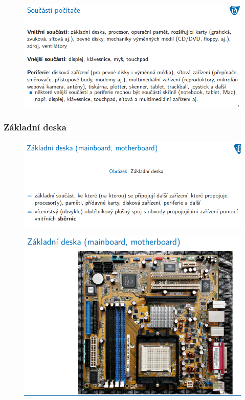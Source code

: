 \documentclass[10pt,a4paper]{article}
\begin{document}
\begin{figure} [h]
	\includegraphics[scale=0.65]{img/prvni_odstavec/otazka4/soucasti_pocitace3.png}	
\end{figure}

\clearpage
\subsubsection{Základní deska}
\begin{figure} [h]
	\includegraphics[scale=0.65]{img/prvni_odstavec/otazka4/zakladni_deska1.png}	
\end{figure}

\begin{figure} [h]
	\includegraphics[scale=0.65]{img/prvni_odstavec/otazka4/zakladni_deska2.png}	
\end{figure}
\end{document}
